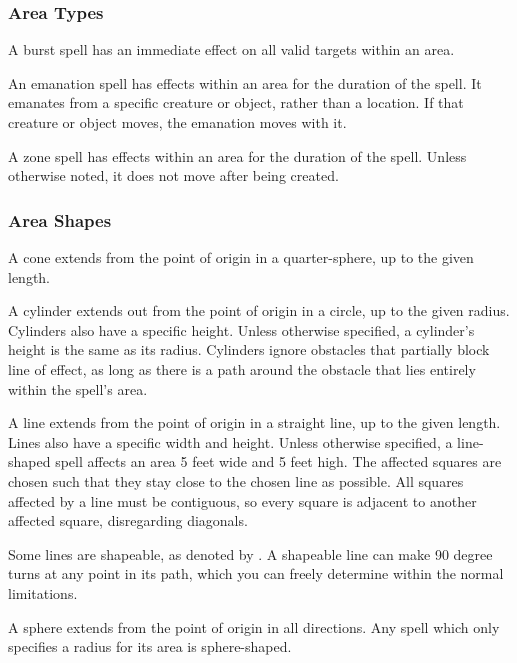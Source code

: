         \subsubsection{Area Types}\label{Area Types}

             A burst spell has an immediate effect on all valid targets within an area.

             An emanation spell has effects within an area for the duration of the spell. It emanates from a specific creature or object, rather than a location. If that creature or object moves, the emanation moves with it.

             A zone spell has effects within an area for the duration of the spell. Unless otherwise noted, it does not move after being created.

        \subsubsection{Area Shapes}

             A cone extends from the point of origin in a quarter-sphere, up to the given length.

             A cylinder extends out from the point of origin in a circle, up to the given radius. Cylinders also have a specific height. Unless otherwise specified, a cylinder's height is the same as its radius. Cylinders ignore obstacles that partially block line of effect, as long as there is a path around the obstacle that lies entirely within the spell's area.

             A line extends from the point of origin in a straight line, up to the given length. Lines also have a specific width and height. Unless otherwise specified, a line-shaped spell affects an area 5 feet wide and 5 feet high. The affected squares are chosen such that they stay close to the chosen line as possible. All squares affected by a line must be contiguous, so every square is adjacent to another affected square, disregarding diagonals.

            \label{Shapeable} Some lines are shapeable, as denoted by \shapeable. A shapeable line can make 90 degree turns at any point in its path, which you can freely determine within the normal limitations.

             A sphere extends from the point of origin in all directions. Any spell which only specifies a radius for its area is sphere-shaped.


